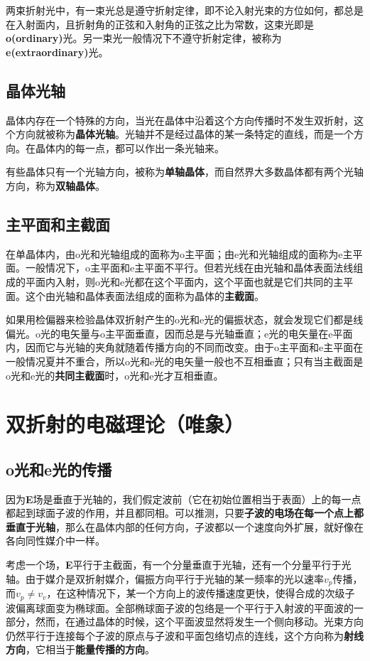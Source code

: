 \documentclass[UTF8]{ctexart}
\newcommand{\backdoc}{\normalsize}
\begin{document}
	\backdoc
	两束折射光中，有一束光总是遵守折射定律，即不论入射光束的方位如何，都总是在入射面内，且折射角的正弦和入射角的正弦之比为常数，这束光即是\textbf{o(ordinary)}光。另一束光一般情况下不遵守折射定律，被称为\textbf{e(extraordinary)}光。
	
	\subsection{晶体光轴}
	
	\backdoc
	晶体内存在一个特殊的方向，当光在晶体中沿着这个方向传播时不发生双折射，这个方向就被称为\textbf{晶体光轴}。光轴并不是经过晶体的某一条特定的直线，而是一个方向。在晶体内的每一点，都可以作出一条光轴来。
	
	有些晶体只有一个光轴方向，被称为\textbf{单轴晶体}，而自然界大多数晶体都有两个光轴方向，称为\textbf{双轴晶体}。
	
	\subsection{主平面和主截面}
	
	\backdoc
	在单晶体内，由o光和光轴组成的面称为o主平面；由e光和光轴组成的面称为e主平面。一般情况下，o主平面和e主平面不平行。但若光线在由光轴和晶体表面法线组成的平面内入射，则o光和e光都在这个平面内，这个平面也就是它们共同的主平面。这个由光轴和晶体表面法组成的面称为晶体的\textbf{主截面}。
	
	如果用检偏器来检验晶体双折射产生的o光和e光的偏振状态，就会发现它们都是线偏光。o光的电矢量与o主平面垂直，因而总是与光轴垂直；e光的电矢量在e平面内，因而它与光轴的夹角就随着传播方向的不同而改变。由于o主平面和e主平面在一般情况夏并不重合，所以o光和e光的电矢量一般也不互相垂直；只有当主截面是o光和e光的\textbf{共同主截面}时，o光和e光才互相垂直。
	
	\section{双折射的电磁理论（唯象）}
	\subsection{o光和e光的传播}
	
	\backdoc
	因为\textbf{E}场是垂直于光轴的，我们假定波前（它在初始位置相当于表面）上的每一点都起到球面子波的作用，并且都同相。可以推测，只要\textbf{子波的电场在每一个点上都垂直于光轴}，那么在晶体内部的任何方向，子波都以一个速度向外扩展，就好像在各向同性媒介中一样。
	
	考虑一个场，\textbf{E}平行于主截面，有一个分量垂直于光轴，还有一个分量平行于光轴。由于媒介是双折射媒介，偏振方向平行于光轴的某一频率的光以速率$v_{p}$传播，而$v_{p} \neq v_{v}$，在这种情况下，某一个方向上的波传播速度更快，使得合成的次级子波偏离球面变为椭球面。全部椭球面子波的包络是一个平行于入射波的平面波的一部分，然而，在通过晶体的时候，这个平面波显然将发生一个侧向移动。光束方向仍然平行于连接每个子波的原点与子波和平面包络切点的连线，这个方向称为\textbf{射线方向}，它相当于\textbf{能量传播的方向}。
	
\end{document}
